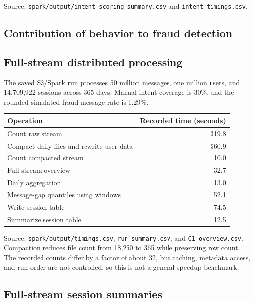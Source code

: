 \documentclass[
  english,
  11pt,
  letterpaper,
]{article}
\newcounter{none} %
\begin{document}
Source: \texttt{spark/output/intent\_scoring\_summary.csv} and
\texttt{intent\_timings.csv}.

\subsection{Contribution of behavior to fraud
detection}\label{contribution-of-behavior-to-fraud-detection}

\subsection{Full-stream distributed
processing}\label{full-stream-distributed-processing}

The saved S3/Spark run processes 50 million messages, one million users,
and 14,709,922 sessions across 365 days. Manual intent coverage is 30\%,
and the rounded simulated fraud-message rate is 1.29\%.

{\def\LTcaptype{none} %
\begin{longtable}[]{@{}lr@{}}
\toprule\noalign{}
Operation & Recorded time (seconds) \\
\midrule\noalign{}
\endhead
\bottomrule\noalign{}
\endlastfoot
Count raw stream & 319.8 \\
Compact daily files and rewrite user data & 560.9 \\
Count compacted stream & 10.0 \\
Full-stream overview & 32.7 \\
Daily aggregation & 13.0 \\
Message-gap quantiles using windows & 52.1 \\
Write session table & 74.5 \\
Summarize session table & 12.5 \\
\end{longtable}
}

Source: \texttt{spark/output/timings.csv}, \texttt{run\_summary.csv},
and \texttt{C1\_overview.csv}. Compaction reduces file count from 18,250
to 365 while preserving row count. The recorded counts differ by a
factor of about 32, but caching, metadata access, and run order are not
controlled, so this is not a general speedup benchmark.

\subsection{Full-stream session
summaries}\label{full-stream-session-summaries}
\end{document}
